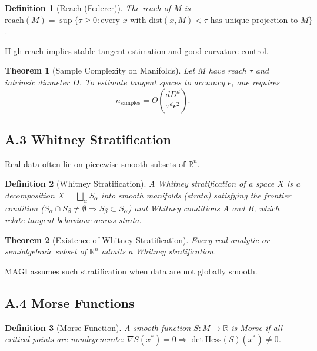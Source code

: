 \documentclass[11pt,a4paper,twocolumn]{article}
\newtheorem*{theorem*}{Theorem}
\newtheorem*{definition*}{Definition}
\begin{document}
\begin{definition*}[Reach (Federer)]
The reach of $M$ is
$\mathrm{reach}(M) = \sup\{\tau \ge 0 : \text{every } x \text{ with }
\mathrm{dist}(x,M) < \tau \text{ has unique projection to } M\}$.
\end{definition*}

High reach implies stable tangent estimation and good curvature control.

\begin{theorem*}[Sample Complexity on Manifolds]
Let $M$ have reach $\tau$ and intrinsic diameter $D$.
To estimate tangent spaces to accuracy $\epsilon$, one requires
\[
n_{\mathrm{samples}} = O\!\left(\frac{d D^d}{\tau^d \epsilon^2}\right).
\]
\end{theorem*}

\subsection*{A.3 Whitney Stratification}

Real data often lie on piecewise-smooth subsets of $\mathbb{R}^n$.

\begin{definition*}[Whitney Stratification]
A Whitney stratification of a space $X$ is a decomposition
$X = \bigsqcup_{\alpha} S_\alpha$ into smooth manifolds (strata)
satisfying the frontier condition ($\overline{S_\alpha} \cap S_\beta
\neq \emptyset \Rightarrow S_\beta \subset \overline{S_\alpha}$) and
Whitney conditions A and B, which relate tangent behaviour across strata.
\end{definition*}

\begin{theorem*}[Existence of Whitney Stratification]
Every real analytic or semialgebraic subset of $\mathbb{R}^n$
admits a Whitney stratification.
\end{theorem*}

MAGI assumes such stratification when data are not globally smooth.

\subsection*{A.4 Morse Functions}

\begin{definition*}[Morse Function]
A smooth function $S : M \to \mathbb{R}$ is Morse if all critical points
are nondegenerate: $\nabla S(x^\ast)=0 \Rightarrow \det \mathrm{Hess}(S)(x^\ast) \neq 0$.
\end{definition*}
\end{document}
